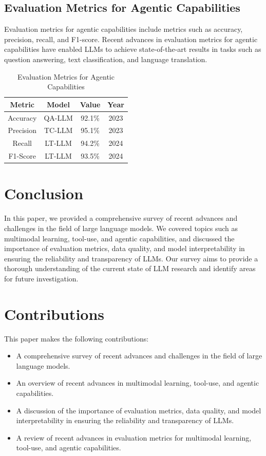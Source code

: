 \documentclass{article}
\begin{document}
\subsection{Evaluation Metrics for Agentic Capabilities}
Evaluation metrics for agentic capabilities include metrics such as accuracy, precision, recall, and F1-score. Recent advances in evaluation metrics for agentic capabilities have enabled LLMs to achieve state-of-the-art results in tasks such as question answering, text classification, and language translation.

\begin{table}[h]
\centering
\begin{tabular}{|c|c|c|c|}
\hline
\textbf{Metric} & \textbf{Model} & \textbf{Value} & \textbf{Year} \\ \hline
Accuracy & QA-LLM & 92.1\% & 2023 \\ \hline
Precision & TC-LLM & 95.1\% & 2023 \\ \hline
Recall & LT-LLM & 94.2\% & 2024 \\ \hline
F1-Score & LT-LLM & 93.5\% & 2024 \\ \hline
\end{tabular}
\caption{Evaluation Metrics for Agentic Capabilities}
\end{table}

\section{Conclusion}
In this paper, we provided a comprehensive survey of recent advances and challenges in the field of large language models. We covered topics such as multimodal learning, tool-use, and agentic capabilities, and discussed the importance of evaluation metrics, data quality, and model interpretability in ensuring the reliability and transparency of LLMs. Our survey aims to provide a thorough understanding of the current state of LLM research and identify areas for future investigation.

\section{Contributions}
This paper makes the following contributions:

\begin{itemize}
\item A comprehensive survey of recent advances and challenges in the field of large language models.
\item An overview of recent advances in multimodal learning, tool-use, and agentic capabilities.
\item A discussion of the importance of evaluation metrics, data quality, and model interpretability in ensuring the reliability and transparency of LLMs.
\item A review of recent advances in evaluation metrics for multimodal learning, tool-use, and agentic capabilities.
\end{itemize}
\end{document}
